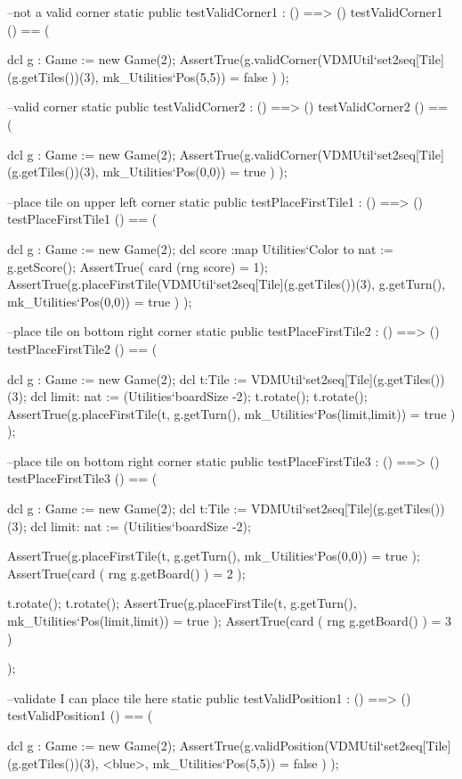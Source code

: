 \begin{vdm_al}
 --not a valid corner
 static public testValidCorner1 : () ==> ()
 testValidCorner1 () == (
  
  dcl g : Game := new Game(2);
  AssertTrue(g.validCorner(VDMUtil`set2seq[Tile](g.getTiles())(3), mk_Utilities`Pos(5,5)) = false )
 );
 
 --valid corner
 static public testValidCorner2 : () ==> ()
 testValidCorner2 () == (
  
  dcl g : Game := new Game(2);
  AssertTrue(g.validCorner(VDMUtil`set2seq[Tile](g.getTiles())(3), mk_Utilities`Pos(0,0)) = true )
 );
 
 --place tile on upper left corner
 static public testPlaceFirstTile1 : () ==> ()
 testPlaceFirstTile1 () == (
  
  dcl g : Game := new Game(2);
  dcl score :map Utilities`Color to nat := g.getScore();
  AssertTrue( card (rng score) = 1);
  AssertTrue(g.placeFirstTile(VDMUtil`set2seq[Tile](g.getTiles())(3), g.getTurn(),
       mk_Utilities`Pos(0,0)) = true )
 );
 
 --place tile on bottom right corner
 static public testPlaceFirstTile2 : () ==> ()
 testPlaceFirstTile2 () == (
  
  dcl g : Game := new Game(2);
  dcl t:Tile := VDMUtil`set2seq[Tile](g.getTiles())(3);
  dcl limit: nat := (Utilities`boardSize -2);
  t.rotate();
  t.rotate();
  AssertTrue(g.placeFirstTile(t, g.getTurn(), mk_Utilities`Pos(limit,limit)) = true )
 );
 
 --place tile on bottom right corner
 static public testPlaceFirstTile3 : () ==> ()
 testPlaceFirstTile3 () == (
  
  dcl g : Game := new Game(2);
  dcl t:Tile := VDMUtil`set2seq[Tile](g.getTiles())(3);
  dcl limit: nat := (Utilities`boardSize -2);
  
  AssertTrue(g.placeFirstTile(t, g.getTurn(), mk_Utilities`Pos(0,0)) = true );
  AssertTrue(card ( rng g.getBoard() ) = 2 );
  
  t.rotate();
  t.rotate();
  AssertTrue(g.placeFirstTile(t, g.getTurn(), mk_Utilities`Pos(limit,limit)) = true );
  AssertTrue(card ( rng g.getBoard() ) = 3 )
  
 );
 
 --validate I can place tile here
 static public testValidPosition1 : () ==> ()
 testValidPosition1 () == (
  
  dcl g : Game := new Game(2);
  AssertTrue(g.validPosition(VDMUtil`set2seq[Tile](g.getTiles())(3), <blue>,
        mk_Utilities`Pos(5,5)) = false )
 );
 

\end{vdm_al}
